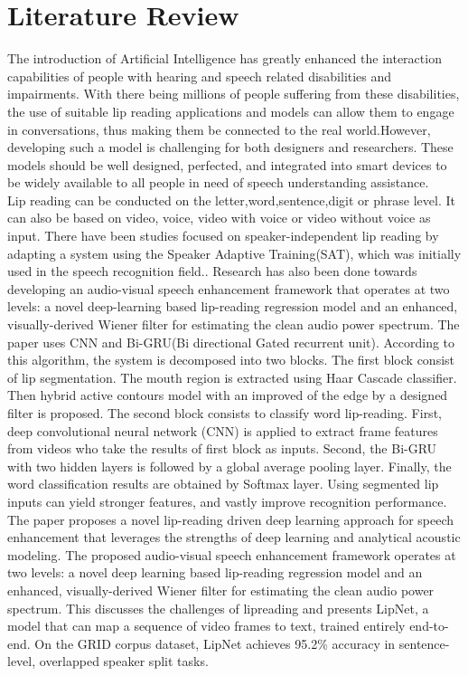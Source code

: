 \chapter{Literature Review}
The introduction of Artificial Intelligence has greatly enhanced the interaction capabilities of people with hearing and speech related disabilities and impairments. With there being millions of people suffering from these disabilities, the use of suitable lip reading applications and models can allow them to engage in conversations, thus making them be connected to the real world.However, developing such a model is challenging for both designers and researchers. These models should be well designed,
perfected, and integrated into smart devices to be widely available to all people in need of speech understanding assistance.
\\Lip reading can be conducted on the letter,word,sentence,digit or phrase level. It can also be based on video, voice, video with voice or video without voice as input. There have been studies focused on speaker-independent lip reading by adapting a system using the Speaker Adaptive Training(SAT), which was initially used in the speech recognition field.\cite{almajai2016improved}. 
Research has also been done towards developing an audio-visual speech enhancement framework that operates at two levels: a novel deep-learning based lip-reading regression model and an enhanced, visually-derived Wiener filter for estimating the clean audio power spectrum.\cite{adeel2019lip}
The paper \cite{miled2023lip} uses CNN and Bi-GRU(Bi directional Gated recurrent unit). According to this algorithm, the system is decomposed into two blocks. The first block consist of lip segmentation. The mouth region is extracted using Haar Cascade classifier. Then hybrid active contours model with an improved of the edge by a designed filter is proposed. The second block consists to classify word lip-reading. First, deep convolutional neural network (CNN) is applied to extract frame features from videos who take the results of first block as inputs. Second, the Bi-GRU with two hidden layers is followed by a global average pooling layer. Finally, the word classification results are obtained by Softmax layer. Using segmented lip inputs can yield stronger features, and vastly improve recognition performance.
The paper \cite{assael2016lipnet} proposes a novel lip-reading driven deep learning approach for speech enhancement that leverages the strengths of deep learning and analytical acoustic modeling. The proposed audio-visual speech enhancement framework operates at two levels: a novel deep learning based lip-reading regression model and an enhanced, visually-derived Wiener filter for estimating the clean audio power spectrum. This  discusses the challenges of lipreading and presents LipNet, a model that can map a sequence of video frames to text, trained entirely end-to-end. On the GRID corpus dataset, LipNet achieves 95.2\% accuracy in sentence-level, overlapped speaker split tasks.
